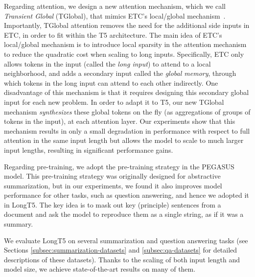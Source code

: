 \documentclass[11pt]{article}
\begin{document}
Regarding attention, we design a new attention mechanism, which we call {\em Transient Global} (TGlobal), that mimics ETC's local/global mechanism~\cite{etc}. Importantly, TGlobal attention removes the need for the additional side inputs in ETC, in order to fit within the T5 architecture. The main idea of ETC's local/global mechanism is to introduce local sparsity in the attention mechanism to reduce the quadratic cost when scaling to long inputs. Specifically, ETC only allows tokens in the input (called the {\em long input}) to attend to a local neighborhood, and adds a secondary input called the {\em global memory}, through which tokens in the long input can attend to each other indirectly. One disadvantage of this mechanism is that it requires designing this secondary global input for each new problem. In order to adapt it to T5, our new TGlobal mechanism {\em synthesizes} these global tokens on the fly (as aggregations of groups of tokens in the input), at each attention layer. Our experiments show that this mechanism results in only a small degradation in performance with respect to full attention in the same input length but allows the model to scale to much larger input lengths, resulting in significant performance gains.

Regarding pre-training, we adopt the pre-training strategy in the PEGASUS~\cite{pegasus} model. This pre-training strategy was originally designed for abstractive summarization, but in our experiments, we found it also improves model performance for other tasks, such as question answering, and hence we adopted it in LongT5. The key idea is to mask out key (principle) sentences from a document and ask the model to reproduce them as a single string, as if it was a summary.



We evaluate LongT5 on several summarization and question answering tasks (see Sections \ref{subsec:summarization-datasets} and \ref{subsec:qa-datasets} for detailed descriptions of these datasets). Thanks to the scaling of both input length and model size, we achieve state-of-the-art results on many of them.
\end{document}
